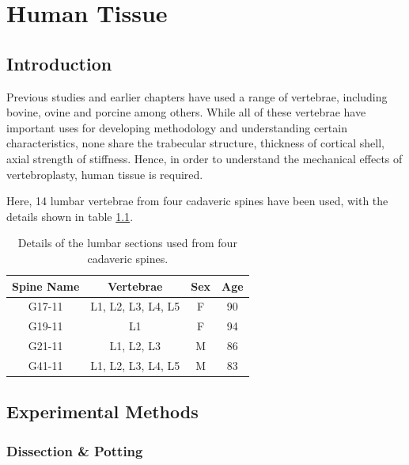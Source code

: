\chapter{Human Tissue} \label{Chapter_HT}

\section{Introduction}

Previous studies and earlier chapters have used a range of vertebrae, including bovine, ovine and porcine among others. While all of these vertebrae have important uses for developing methodology and understanding certain characteristics, none share the trabecular structure, thickness of cortical shell, axial strength of stiffness. Hence, in order to understand the mechanical effects of vertebroplasty, human tissue is required.

Here, 14 lumbar vertebrae from four cadaveric spines have been used, with the details shown in table \ref{tab:vertebrae}.

\begin{table}[ht!]
\centering
  \caption{Details of the lumbar sections used from four cadaveric spines.}
  \label{tab:vertebrae}
  \begin{tabular}{c|c|c|c}
    Spine Name & Vertebrae & Sex & Age \\ \hline \hline
    G17-11& L1, L2, L3, L4, L5 & F & 90\\ \hline
    G19-11& L1 & F & 94\\ \hline
    G21-11& L1, L2, L3 & M & 86\\ \hline
    G41-11& L1, L2, L3, L4, L5 & M & 83\\ \hline

  \end{tabular}

\end{table}


\section{Experimental Methods}

\subsection{Dissection \& Potting}

